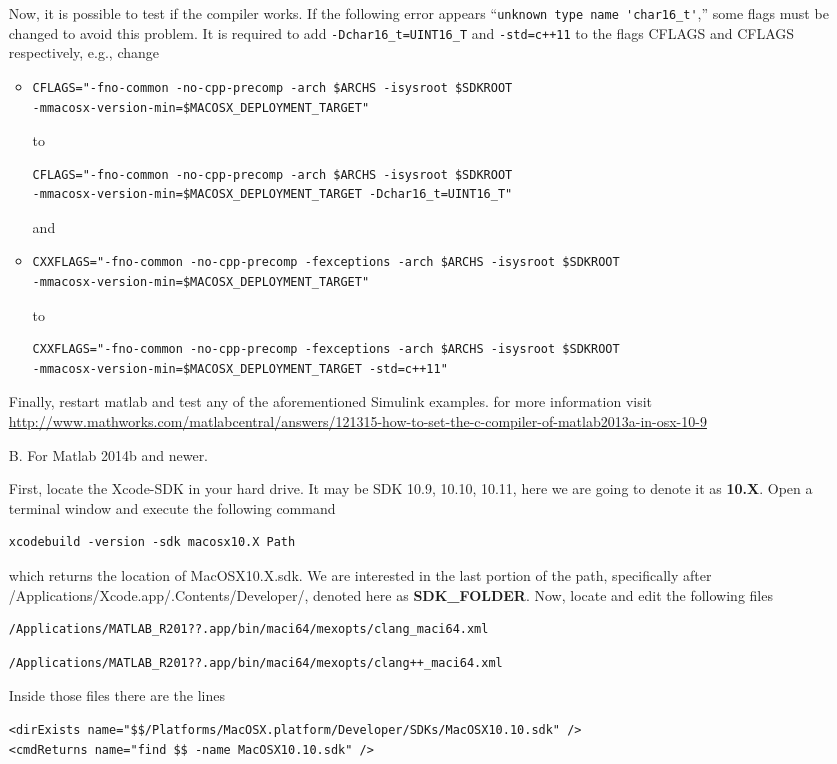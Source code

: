 \documentclass{article}
\begin{document}
\begin{itemize}
Now, it is possible to test if the compiler works. If the following error appears
``\verb!unknown type name 'char16_t'!,'' 
some flags must be changed to avoid this problem. It is required to add \verb!-Dchar16_t=UINT16_T! and \verb!-std=c++11! to the flags CFLAGS and CFLAGS respectively, e.g., change
\begin{itemize}
\item
\begin{verbatim}
CFLAGS="-fno-common -no-cpp-precomp -arch $ARCHS -isysroot $SDKROOT 
-mmacosx-version-min=$MACOSX_DEPLOYMENT_TARGET"
\end{verbatim}
to
\begin{verbatim}
CFLAGS="-fno-common -no-cpp-precomp -arch $ARCHS -isysroot $SDKROOT 
-mmacosx-version-min=$MACOSX_DEPLOYMENT_TARGET -Dchar16_t=UINT16_T"
\end{verbatim}
and
\item
\begin{verbatim}
CXXFLAGS="-fno-common -no-cpp-precomp -fexceptions -arch $ARCHS -isysroot $SDKROOT 
-mmacosx-version-min=$MACOSX_DEPLOYMENT_TARGET"
\end{verbatim}
to
\begin{verbatim}
CXXFLAGS="-fno-common -no-cpp-precomp -fexceptions -arch $ARCHS -isysroot $SDKROOT 
-mmacosx-version-min=$MACOSX_DEPLOYMENT_TARGET -std=c++11"
\end{verbatim}
\end{itemize}
Finally, restart matlab and test any of the aforementioned Simulink examples.
for more information visit {\footnotesize\url{http://www.mathworks.com/matlabcentral/answers/121315-how-to-set-the-c-compiler-of-matlab2013a-in-osx-10-9}}

\item[B.] For Matlab 2014b and newer. 

First, locate the Xcode-SDK in your hard drive. It may be SDK 10.9, 10.10, 10.11, here we are going to denote it as \textbf{10.X}. Open a terminal window and execute the following command
\begin{verbatim}
xcodebuild -version -sdk macosx10.X Path
\end{verbatim}
which returns the location of MacOSX10.X.sdk. 
We are interested in the last portion of the path, specifically after /Applications/Xcode.app/.Contents/Developer/, denoted here as \textbf{SDK\_FOLDER}. Now, locate and edit the following files
\begin{verbatim}/Applications/MATLAB_R201??.app/bin/maci64/mexopts/clang_maci64.xml\end{verbatim}
\begin{verbatim}/Applications/MATLAB_R201??.app/bin/maci64/mexopts/clang++_maci64.xml\end{verbatim}
Inside those files there are the lines
\begin{verbatim}
<dirExists name="$$/Platforms/MacOSX.platform/Developer/SDKs/MacOSX10.10.sdk" />
<cmdReturns name="find $$ -name MacOSX10.10.sdk" />
\end{verbatim}


\end{itemize}
\end{document}
